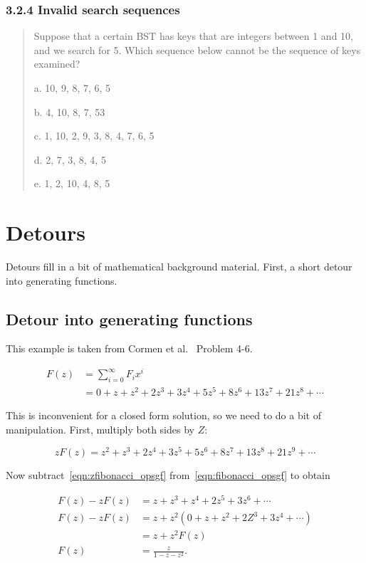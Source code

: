 \documentclass{article}
\begin{document}
\subsubsection{3.2.4 Invalid search sequences}

\begin{quote}
Suppose that a certain BST has keys that are integers between 1 and 10, and we
search for 5. Which sequence below cannot be the sequence of keys examined?

a. 10, 9, 8, 7, 6, 5

b. 4, 10, 8, 7, 53

c. 1, 10, 2, 9, 3, 8, 4, 7, 6, 5

d. 2, 7, 3, 8, 4, 5

e. 1, 2, 10, 4, 8, 5
\end{quote}

\section{Detours}

Detours fill in a bit of mathematical background material.
First, a short detour into generating functions.

\subsection{Detour into generating functions}

This example is taken from Cormen et al.~\cite[p. 74]{cormen:th:1990}
Problem 4-6.

\begin{align}
F(z) & = \sum_{i=0}^{\infty} F_ix^i\\
\label{eqn:fibonacci_opsgf}
     & = 0 + z + z^2 + 2z^3 + 3z^4 + 5z^5 + 8z^6 + 13z^7 + 21z^8+\cdots
\end{align}

This is inconvenient for a closed form solution, so we need to do a bit of
manipulation. First, multiply both sides by $Z$:

\begin{equation}
\label{eqn:zfibonacci_opsgf}
zF(z) = z^2 + z^3 + 2z^4 + 3z^5 + 5z^6 + 8z^7 + 13z^8 + 21z^9+\cdots
\end{equation}

Now subtract~\ref{eqn:zfibonacci_opsgf} from~\ref{eqn:fibonacci_opsgf} to
obtain

\begin{align}
F(z) - zF(z) & = z + z^3 + z^4 + 2z^5 + 3z^6 +\cdots\\
F(z) - zF(z) & = z + z^2(0 + z + z^2 + 2Z^3 + 3z^4 +\cdots)\\
             & = z + z^2F(z)\\
        F(z) & = \frac{z}{1-z-z^2}.
\end{align}
\end{document}
